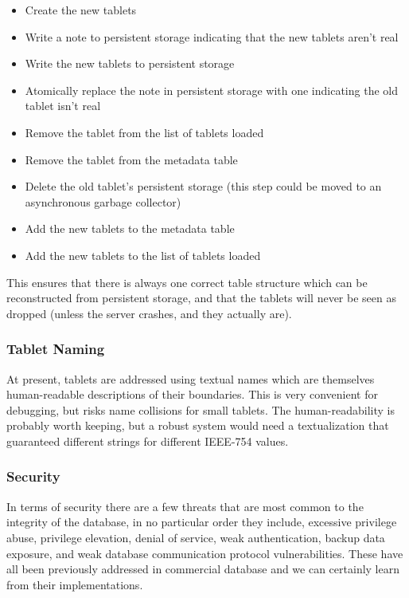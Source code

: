 \documentclass[11pt]{article}
\begin{document}
\begin{itemize}
\setlength\itemsep{0em}
\item Create the new tablets
\item Write a note to persistent storage indicating that the new tablets aren't real
\item Write the new tablets to persistent storage
\item Atomically replace the note in persistent storage with one indicating the old tablet isn't real
\item Remove the tablet from the list of tablets loaded
\item Remove the tablet from the metadata table
\item Delete the old tablet's persistent storage (this step could be moved to an asynchronous garbage collector)
\item Add the new tablets to the metadata table
\item Add the new tablets to the list of tablets loaded
\end{itemize}

This ensures that there is always one correct table structure which can be reconstructed from persistent storage, and that the tablets will never be seen as dropped (unless the server crashes, and they actually are).

\subsubsection{Tablet Naming}

At present, tablets are addressed using textual names which are themselves human-readable descriptions of their boundaries.  This is very convenient for debugging, but risks name collisions for small tablets.  The human-readability is probably worth keeping, but a robust system would need a textualization that guaranteed different strings for different IEEE-754 values.

\subsubsection{Security}

In terms of security there are a few threats that are most common to the integrity of the database, in no particular order they include, excessive privilege abuse, privilege elevation, denial of service, weak authentication, backup data exposure, and weak database communication protocol vulnerabilities. These have all been previously addressed in commercial database and we can certainly learn from their implementations. 
\end{document}
